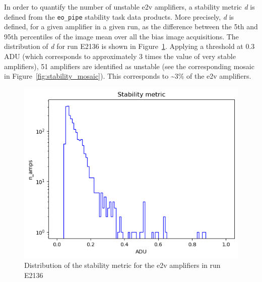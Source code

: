 In order to quantify the number of unstable e2v amplifiers, a stability
metric \emph{d} is defined from the {\tt eo\_pipe}
stability task data products. More precisely, \emph{d} is defined, for a
given amplifier in a given run, as the difference between the 5th and
95th percentiles of the image mean over all the bias image acquisitions. The
distribution of \emph{d} for run E2136 is shown in Figure~\ref{fig:stability_dist}. Applying a
threshold at 0.3\,ADU (which corresponds to approximately 3 times the value of very stable amplifiers), 51 amplifiers are identified as unstable (see the
corresponding mosaic in Figure~\ref{fig:stability_mosaic}). This corresponds to \sim3\% of the e2v
amplifiers.

\begin{figure}[htbp]
\centering
\begin{minipage}{0.45\textwidth}
    \centering
    \includegraphics[width=\textwidth]{figures/E2136_distribution_d.png}
    \caption{Distribution of the stability metric for the e2v amplifiers in run E2136}
    \label{fig:stability_dist}
\end{minipage}
\hfill
\begin{minipage}{0.45\textwidth}
    \centering

\end{minipage}
\end{figure}
